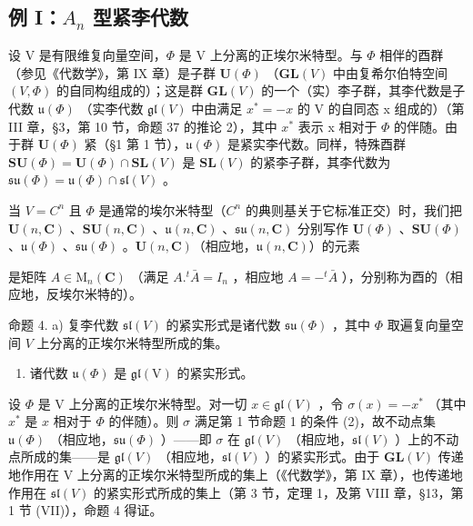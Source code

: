 \subsection{\texorpdfstring{例 I：\(A_{n}\) 型紧李代数}{例 I：A\_\{n\} 型紧李代数}}

设 V 是有限维复向量空间，\(\Phi\) 是 V 上分离的正埃尔米特型。与 \(\Phi\) 相伴的酉群（参见《代数学》，第 IX 章）是子群 \(\mathbf{U}(\Phi)\) （\(\mathbf{GL}(V)\) 中由复希尔伯特空间 \((V,\Phi)\) 的自同构组成的）；这是群 \(\mathbf{GL}(V)\) 的一个（实）李子群，其李代数是子代数 \(\mathfrak{u}(\Phi)\) （实李代数 \(\mathfrak{gl}(V)\) 中由满足 \(x^{*} = -x\) 的 V 的自同态 x 组成的）（第 III 章，§3，第 10 节，命题 37 的推论 2），其中 \(x^{*}\) 表示 x 相对于 \(\Phi\) 的伴随。由于群 \(\mathbf{U}(\Phi)\) 紧（§1 第 1 节），\(\mathfrak{u}(\Phi)\) 是紧实李代数。同样，特殊酉群 \(\mathbf{SU}(\Phi) = \mathbf{U}(\Phi) \cap \mathbf{SL}(V)\) 是 \(\mathbf{SL}(V)\) 的紧李子群，其李代数为 \(\mathfrak{su}(\Phi) = \mathfrak{u}(\Phi) \cap \mathfrak{sl}(V)\) 。

当 \(V = C^{n}\) 且 \(\varPhi\) 是通常的埃尔米特型（\(C^{n}\) 的典则基关于它标准正交）时，我们把 \(\mathbf{U}(n, \mathbf{C})\) 、\(\mathbf{SU}(n, \mathbf{C})\) 、\(\mathfrak{u}(n, \mathbf{C})\) 、\(\mathfrak{s}\mathfrak{u}(n, \mathbf{C})\) 分别写作 \(\mathbf{U}(\varPhi)\) 、\(\mathbf{SU}(\varPhi)\) 、\(\mathfrak{u}(\varPhi)\) 、\(\mathfrak{s}\mathfrak{u}(\varPhi)\) 。\(\mathbf{U}(n, \mathbf{C})\)（相应地，\(\mathfrak{u}(n, \mathbf{C})\)）的元素

是矩阵 \(A \in \mathrm{M}_{n}(\mathbf{C})\) （满足 \(A.^{t}\bar{A} = I_{n}\) ，相应地 \(A = -^{t}\bar{A}\) ），分别称为酉的（相应地，反埃尔米特的）。

命题 4. a) 复李代数 \(\mathfrak{sl}(V)\) 的紧实形式是诸代数 \(\mathfrak{su}(\Phi)\) ，其中 \(\Phi\) 取遍复向量空间 \(V\) 上分离的正埃尔米特型所成的集。

\begin{enumerate}
\def\labelenumi{\alph{enumi})}
\setcounter{enumi}{1}
\tightlist
\item
  诸代数 \(\mathfrak{u}(\varPhi)\) 是 \(\mathfrak{gl}(\mathrm{V})\) 的紧实形式。
\end{enumerate}

设 \(\varPhi\) 是 V 上分离的正埃尔米特型。对一切 \(x\in\mathfrak{gl}(V)\) ，令 \(\sigma(x)=-x^{*}\) （其中 \(x^{*}\) 是 \(x\) 相对于 \(\varPhi\) 的伴随）。则 \(\sigma\) 满足第 1 节命题 1 的条件 (2)，故不动点集 \(\mathfrak{u}(\varPhi)\) （相应地，\(\mathfrak{su}(\varPhi)\) ）——即 \(\sigma\) 在 \(\mathfrak{gl}(V)\) （相应地，\(\mathfrak{sl}(V)\) ）上的不动点所成的集——是 \(\mathfrak{gl}(V)\) （相应地，\(\mathfrak{sl}(V)\) ）的紧实形式。由于 \(\mathbf{GL}(V)\) 传递地作用在 V 上分离的正埃尔米特型所成的集上（《代数学》，第 IX 章），也传递地作用在 \(\mathfrak{sl}(V)\) 的紧实形式所成的集上（第 3 节，定理 1，及第 VIII 章，§13，第 1 节 (VII)），命题 4 得证。

